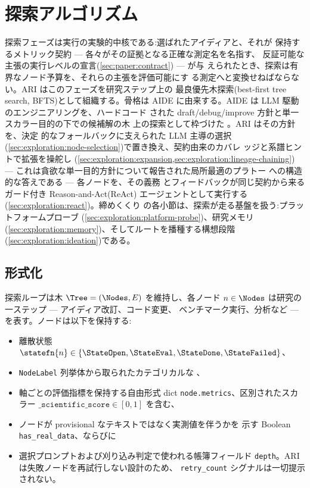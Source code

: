 \section{探索アルゴリズム}\label{sec:exploration}

探索フェーズは実行の実験的中核である:選ばれたアイディアと、それが
保持するメトリック契約 — 各々がその証拠となる正確な測定名を名指す、
反証可能な主張の実行レベルの宣言(\cref{sec:paper:contract}) — が与
えられたとき、探索は有界なノード予算を、それらの主張を評価可能にす
る測定へと変換せねばならない。ARI はこのフェーズを研究ステップ上の
最良優先木探索(best-first tree search, BFTS)として組織する。骨格は
AIDE に由来する。AIDE は LLM 駆動のエンジニアリングを、ハードコード
された draft/debug/improve 方針と単一スカラー目的の下での候補解の木
上の探索として枠づけた \cite{jiang2025aide}。ARI はその方針を、決定
的なフォールバックに支えられた LLM 主導の選択
(\cref{sec:exploration:node-selection})で置き換え、契約由来のカバレ
ッジと系譜ヒントで拡張を操舵し
(\cref{sec:exploration:expansion,sec:exploration:lineage-chaining})
— これは貪欲な単一目的方針について報告された局所最適のプラトー
\cite{jiang2025aide} への構造的な答えである — 各ノードを、その義務
とフィードバックが同じ契約から来るガード付き Reason-and-Act(ReAct)
エージェントとして実行する(\cref{sec:exploration:react})。締めくくり
の各小節は、探索が走る基盤を扱う:プラットフォームプローブ
(\cref{sec:exploration:platform-probe})、研究メモリ
(\cref{sec:exploration:memory})、そしてルートを播種する構想段階
(\cref{sec:exploration:ideation})である。

\subsection{形式化}\label{sec:exploration:formalization}

探索ループは木 $\Tree=(\Nodes, E)$ を維持し、各ノード
$n\in\Nodes$ は研究の一ステップ — アイディア改訂、コード変更、
ベンチマーク実行、分析など — を表す。ノードは以下を保持する:

\begin{itemize}
  \item 離散状態 $\statefn{n}\in\{\StateOpen,\StateEval,\StateDone,\StateFailed\}$、
  \item \texttt{NodeLabel} 列挙体から取られたカテゴリカルな
        、
  \item 軸ごとの評価指標を保持する自由形式 dict
        \texttt{node.metrics}、区別されたスカラー
        $\texttt{\_scientific\_score}\in[0,1]$ を含む、
  \item ノードが provisional なテキストではなく実測値を伴うかを
        示す Boolean \texttt{has\_real\_data}、ならびに
  \item 選択プロンプトおよび刈り込み判定で使われる帳簿フィールド
        \texttt{depth}。ARI は失敗ノードを再試行しない設計のため、
        \texttt{retry\_count} シグナルは一切提示されない。
\end{itemize}

